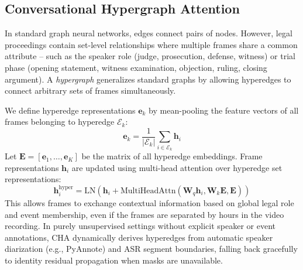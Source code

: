 \documentclass[letterpaper]{article}
\begin{document}
\subsection{Conversational Hypergraph Attention}

In standard graph neural networks, edges connect pairs of nodes. However, legal proceedings contain set-level relationships where multiple frames share a common attribute -- such as the speaker role (judge, prosecution, defense, witness) or trial phase (opening statement, witness examination, objection, ruling, closing argument). A \textit{hypergraph} generalizes standard graphs by allowing hyperedges to connect arbitrary sets of frames simultaneously.

We define hyperedge representations $\mathbf{e}_k$ by mean-pooling the feature vectors of all frames belonging to hyperedge $\mathcal{E}_k$:
\begin{equation}
\mathbf{e}_k = \frac{1}{|\mathcal{E}_k|} \sum_{i \in \mathcal{E}_k} \mathbf{h}_i
\end{equation}
Let $\mathbf{E} = [\mathbf{e}_1, \dots, \mathbf{e}_K]$ be the matrix of all hyperedge embeddings. Frame representations $\mathbf{h}_i$ are updated using multi-head attention over hyperedge set representations:
\begin{equation}
\mathbf{h}_i^{\text{hyper}} = \text{LN}\!\left(\mathbf{h}_i + \text{MultiHeadAttn}(\mathbf{W}_q\mathbf{h}_i, \mathbf{W}_k\mathbf{E}, \mathbf{E})\right)
\end{equation}
This allows frames to exchange contextual information based on global legal role and event membership, even if the frames are separated by hours in the video recording. In purely unsupervised settings without explicit speaker or event annotations, CHA dynamically derives hyperedges from automatic speaker diarization (e.g., PyAnnote) and ASR segment boundaries, falling back gracefully to identity residual propagation when masks are unavailable.
\end{document}
